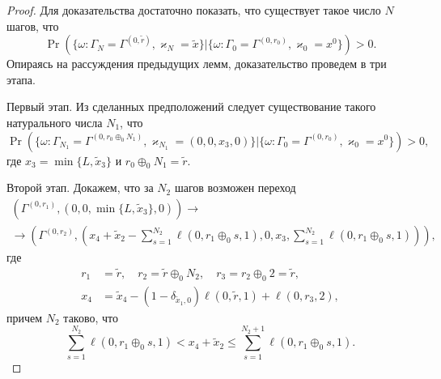\begin{proof}

Для доказательства достаточно показать,  что существует такое число $N$ шагов,  что
\begin{equation*}
\Pr(\{\omega\colon \Gamma_{N}=\Gamma^{(0,  \tilde{r} )},  \varkappa_{N}=\tilde{x}\}|\{\omega\colon 
\Gamma_{0}=\Gamma^{(0,  r_0)},  \varkappa_{0} = x^0\})>0.
\end{equation*}
Опираясь на рассуждения предыдущих лемм,  доказательство проведем в три этапа. 

Первый этап. Из сделанных предположений следует существование такого натурального числа $N_1$,  что 
\begin{equation*}
\!\!\!\Pr(\{\omega\colon \Gamma_{N_1}=\Gamma^{(0, r_0\oplus_0 N_1)},  \varkappa_{N_1}=(0, 0, x_3, 0)\}|\{\omega\colon 
\Gamma_{0}=\Gamma^{(0, r_0)},  \varkappa_{0}=x^0\})>0, 
\end{equation*}
где $x_3=\min\{L, \tilde{x}_3\}$ и $r_0\oplus_0 N_1 = \tilde{r}$.


Второй этап. Докажем,  что за $N_2$ шагов возможен переход
\begin{multline*}
(\Gamma^{(0,  r_1)},  (0,  0,  \min\{L,  \tilde{x}_3\},  0)) \rightarrow \\ 
\rightarrow
    (\Gamma^{(0, r_2)},  (x_4 + \tilde{x}_2 - \sum_{s=1}^{N_2} \ell(0, r_1 \oplus_0 s, 1), 0, x_3, \sum_{s=1}^{N_2} \ell(0, r_1 \oplus_0 s, 1))), 
\end{multline*}
где 
\begin{align*}
r_1 &= \tilde{r},  \quad r_2=\tilde{r}\oplus_0 N_2,  \quad r_3=r_2\oplus_0 2 = \tilde{r}, \\
x_4&=\tilde{x}_4 - (1 - \delta_{\tilde{x}_1, 0})\ell(0, \tilde{r}, 1) + \ell(0, r_3, 2), 
\end{align*}
причем $N_2$ таково,  что 
\begin{equation*}
\sum_{s=1}^{N_2} \ell(0, r_1\oplus_0 s, 1) < x_4 + \tilde{x}_2 \leqslant \sum_{s=1}^{N_2+1} \ell(0, r_1 \oplus_0 s, 1).
\end{equation*}



\end{proof}
